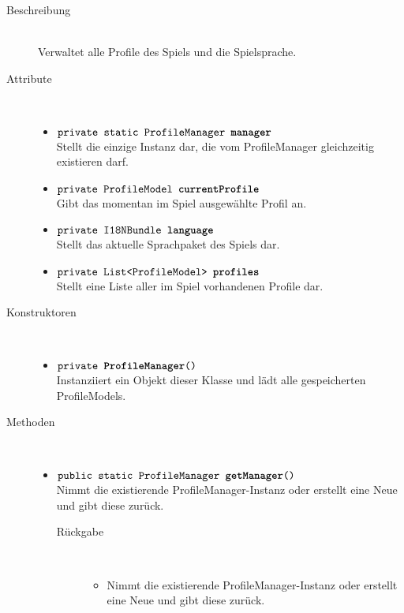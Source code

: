 \begin{description}
\item[Beschreibung] \hfill \\ Verwaltet alle Profile des Spiels und die Spielsprache.

\item[Attribute] \hfill \\
	\vspace{-.8cm}
	\begin{itemize}
		\item $\texttt{private static ProfileManager \textbf{manager}}$ \\ Stellt die einzige Instanz dar, die vom ProfileManager gleichzeitig existieren darf.
		\item $\texttt{private ProfileModel \textbf{currentProfile}}$ \\ Gibt das momentan im Spiel ausgewählte Profil an.
		\item $\texttt{private I18NBundle \textbf{language}}$ \\ Stellt das aktuelle Sprachpaket des Spiels dar.
		\item $\texttt{private List<ProfileModel> \textbf{profiles}}$ \\ Stellt eine Liste aller im Spiel vorhandenen Profile dar.
	\end{itemize}
	
\item[Konstruktoren] \hfill \\
	\vspace{-.8cm}
	\begin{itemize}
		\item $\texttt{private \textbf{ProfileManager}()}$ \\ Instanziiert ein Objekt dieser Klasse und lädt alle gespeicherten ProfileModels.
	\end{itemize}
	
\item[Methoden] \hfill \\
	\vspace{-.8cm}
	\begin{itemize}
		\item $\texttt{public static ProfileManager \textbf{getManager}()}$ \\ Nimmt die existierende ProfileManager-Instanz oder erstellt eine Neue und gibt diese zurück.
		\begin{description}
			\item[Rückgabe] \hfill \\
			\vspace{-.8cm}
			\begin{itemize}
				\item  Nimmt die existierende ProfileManager-Instanz oder erstellt eine Neue und gibt diese zurück.
			\end{itemize}
		\end{description}
		

\end{itemize}
\end{description}
